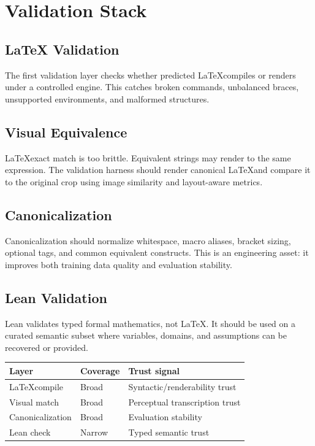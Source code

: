 \documentclass[11pt]{article}
\begin{document}
\section{Validation Stack}

\subsection{LaTeX Validation}

The first validation layer checks whether predicted \LaTeX compiles or renders under a controlled engine. This catches broken commands, unbalanced braces, unsupported environments, and malformed structures.

\subsection{Visual Equivalence}

\LaTeX exact match is too brittle. Equivalent strings may render to the same expression. The validation harness should render canonical \LaTeX and compare it to the original crop using image similarity and layout-aware metrics.

\subsection{Canonicalization}

Canonicalization should normalize whitespace, macro aliases, bracket sizing, optional tags, and common equivalent constructs. This is an engineering asset: it improves both training data quality and evaluation stability.

\subsection{Lean Validation}

Lean validates typed formal mathematics, not \LaTeX. It should be used on a curated semantic subset where variables, domains, and assumptions can be recovered or provided.

\begin{center}
\begin{tabular}{lll}
\toprule
\textbf{Layer} & \textbf{Coverage} & \textbf{Trust signal} \\
\midrule
\LaTeX compile & Broad & Syntactic/renderability trust \\
Visual match & Broad & Perceptual transcription trust \\
Canonicalization & Broad & Evaluation stability \\
Lean check & Narrow & Typed semantic trust \\
\bottomrule
\end{tabular}
\end{center}
\end{document}
